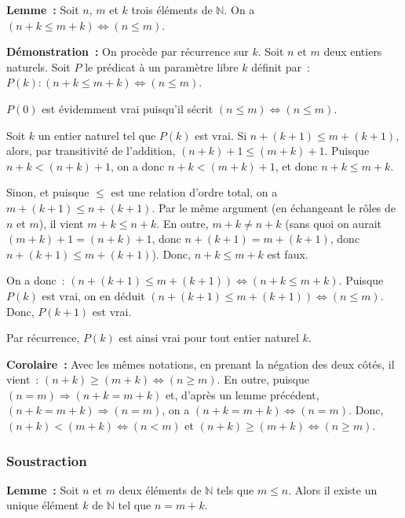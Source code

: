    \done 

\medskip

\noindent\textbf{Lemme :} Soit $n$, $m$ et $k$ trois éléments de $\mathbb{N}$.
    On a $(n + k \leq m + k) \Leftrightarrow (n \leq m)$.

\medskip

\noindent\textbf{Démonstration :} 
    On procède par récurrence sur $k$. 
    Soit $n$ et $m$ deux entiers naturels.
    Soit $P$ le prédicat à un paramètre libre $k$ définit par : $P(k): (n + k \leq m + k) \Leftrightarrow (n \leq m)$. 

    $P(0)$ est évidemment vrai puisqu'il sécrit $(n \leq m) \Leftrightarrow (n \leq m)$.

    Soit $k$ un entier naturel tel que $P(k)$ est vrai.
    Si $n+(k+1) \leq m+(k+1)$, alors, par transitivité de l'addition, $(n+k)+1 \leq (m+k)+1$. 
    Puisque $n+k < (n+k)+1$, on a donc $n+k < (m+k)+1$, et donc $n+k \leq m+k$.
    
    Sinon, et puisque $\leq$ est une relation d'ordre total, on a $m+(k+1) \leq n+(k+1)$.
    Par le même argument (en échangeant le rôles de $n$ et $m$), il vient $m+k \leq n+k$.
    En outre, $m+k \neq n+k$ (sans quoi on aurait $(m+k)+1 = (n+k)+1$, donc $n+(k+1) = m+(k+1)$, donc $n+(k+1) \leq m+(k+1)$).
    Donc, $n+k \leq m+k$ est faux. 

    On a donc : $(n+(k+1) \leq m+(k+1)) \Leftrightarrow (n+k \leq m+k)$. 
    Puisque $P(k)$ est vrai, on en déduit $(n+(k+1) \leq m+(k+1)) \Leftrightarrow (n \leq m)$.
    Donc, $P(k+1)$ est vrai.

    Par récurrence, $P(k)$ est ainsi vrai pour tout entier naturel $k$.

    \done

\medskip

\noindent\textbf{Corolaire :} Avec les mêmes notations, en prenant la négation des deux côtés, il vient : $(n+k) \geq (m+k) \Leftrightarrow (n \geq m)$.
    En outre, puisque $(n = m) \Rightarrow (n+k = m+k)$ et, d'après un lemme précédent, $(n+k = m+k) \Rightarrow (n=m)$, on a $(n+k = m+k) \Leftrightarrow (n = m)$. 
    Donc, $(n+k) < (m+k) \Leftrightarrow (n<m)$ et $(n+k) \geq (m+k) \Leftrightarrow (n \geq m)$.

\subsubsection{Soustraction}

\noindent\textbf{Lemme :} Soit $n$ et $m$ deux éléments de $\mathbb{N}$ tels que $m \leq n$. 
    Alors il existe un unique élément $k$ de $\mathbb{N}$ tel que $n=m+k$.

